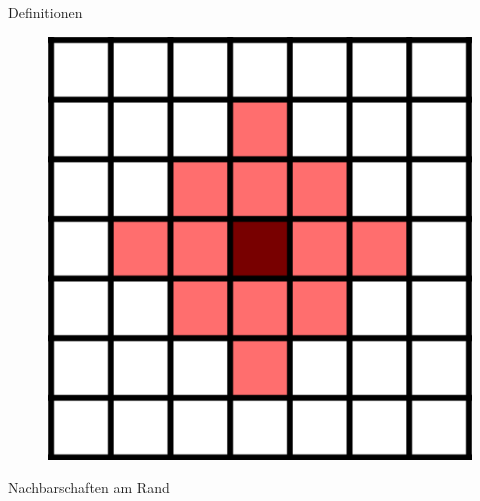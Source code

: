 \documentclass[aspectratio=169]{beamer}
\begin{document}
\begin{frame}{Definitionen}
\begin{multicols*}{2}
\begin{multicols*}{2}
      \begin{figure}[H]
        \centering
        \includegraphics[width = 0.28 \textheight]{von_Neumann_2.png}
      \end{figure}

      \end{multicols*}


      \vfill\null

    \end{multicols*}

  \end{frame}



  \begin{frame}{Nachbarschaften am Rand}
    


  \end{frame}
\end{document}
